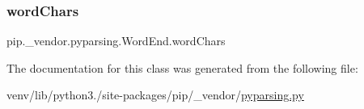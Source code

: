 \subsubsection{\texorpdfstring{word\+Chars}{wordChars}}
{\footnotesize\ttfamily pip.\+\_\+vendor.\+pyparsing.\+Word\+End.\+word\+Chars}



The documentation for this class was generated from the following file\+:\begin{DoxyCompactItemize}
\item 
venv/lib/python3./site-\/packages/pip/\+\_\+vendor/\hyperlink{pip_2__vendor_2pyparsing_8py}{pyparsing.\+py}\end{DoxyCompactItemize}
